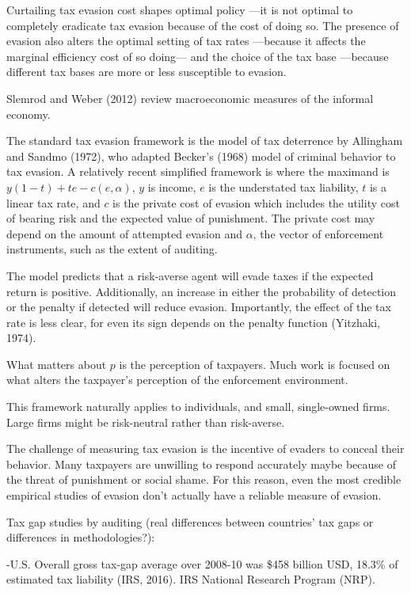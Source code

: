 \documentclass[
  12pt]{article}
\theoremstyle{definition}
\theoremstyle{remark}
\begin{document}
Curtailing tax evasion cost shapes optimal policy ---it is not optimal
to completely eradicate tax evasion because of the cost of doing so. The
presence of evasion also alters the optimal setting of tax rates
---because it affects the marginal efficiency cost of so doing--- and
the choice of the tax base ---because different tax bases are more or
less susceptible to evasion.

Slemrod and Weber (2012) review macroeconomic measures of the informal
economy.

The standard tax evasion framework is the model of tax deterrence by
Allingham and Sandmo (1972), who adapted Becker's (1968) model of
criminal behavior to tax evasion. A relatively recent simplified
framework is where the maximand is \(y(1-t)+te-c(e,\alpha)\), \(y\) is
income, \(e\) is the understated tax liability, \(t\) is a linear tax
rate, and \(c\) is the private cost of evasion which includes the
utility cost of bearing risk and the expected value of punishment. The
private cost may depend on the amount of attempted evasion and
\(\alpha\), the vector of enforcement instruments, such as the extent of
auditing.

The model predicts that a risk-averse agent will evade taxes if the
expected return is positive. Additionally, an increase in either the
probability of detection or the penalty if detected will reduce evasion.
Importantly, the effect of the tax rate is less clear, for even its sign
depends on the penalty function (Yitzhaki, 1974).

What matters about \(p\) is the perception of taxpayers. Much work is
focused on what alters the taxpayer's perception of the enforcement
environment.

This framework naturally applies to individuals, and small, single-owned
firms. Large firms might be risk-neutral rather than risk-averse.

The challenge of measuring tax evasion is the incentive of evaders to
conceal their behavior. Many taxpayers are unwilling to respond
accurately maybe because of the threat of punishment or social shame.
For this reason, even the most credible empirical studies of evasion
don't actually have a reliable measure of evasion.

Tax gap studies by auditing (real differences between countries' tax
gaps or differences in methodologies?):

-U.S. Overall gross tax-gap average over 2008-10 was \$458 billion USD,
18.3\% of estimated tax liability (IRS, 2016). IRS National Research
Program (NRP).
\end{document}
